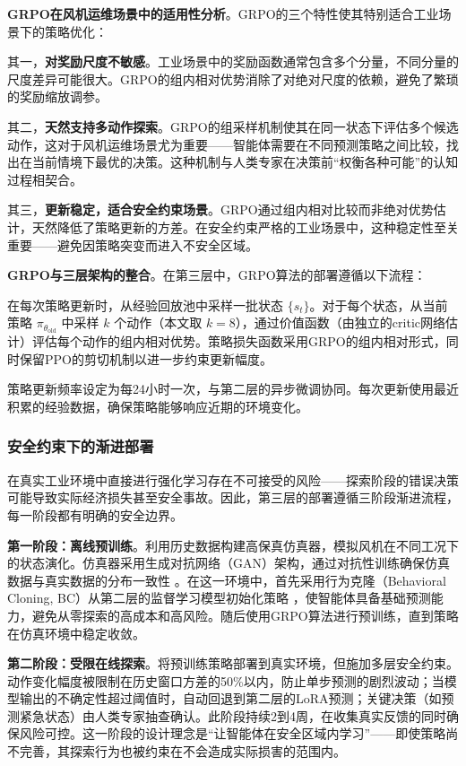 \documentclass[12pt,a4paper]{article}
\begin{document}
\textbf{GRPO在风机运维场景中的适用性分析}。GRPO的三个特性使其特别适合工业场景下的策略优化：

其一，\textbf{对奖励尺度不敏感}。工业场景中的奖励函数通常包含多个分量，不同分量的尺度差异可能很大。GRPO的组内相对优势消除了对绝对尺度的依赖，避免了繁琐的奖励缩放调参。

其二，\textbf{天然支持多动作探索}。GRPO的组采样机制使其在同一状态下评估多个候选动作，这对于风机运维场景尤为重要——智能体需要在不同预测策略之间比较，找出在当前情境下最优的决策。这种机制与人类专家在决策前“权衡各种可能”的认知过程相契合。

其三，\textbf{更新稳定，适合安全约束场景}。GRPO通过组内相对比较而非绝对优势估计，天然降低了策略更新的方差。在安全约束严格的工业场景中，这种稳定性至关重要——避免因策略突变而进入不安全区域。

\textbf{GRPO与三层架构的整合}。在第三层中，GRPO算法的部署遵循以下流程：

在每次策略更新时，从经验回放池中采样一批状态 $\{s_t\}$。对于每个状态，从当前策略 $\pi_{\theta_{\text{old}}}$ 中采样 $k$ 个动作（本文取 $k=8$），通过价值函数（由独立的critic网络估计）评估每个动作的组内相对优势。策略损失函数采用GRPO的组内相对形式，同时保留PPO的剪切机制以进一步约束更新幅度。

策略更新频率设定为每24小时一次，与第二层的异步微调协同。每次更新使用最近积累的经验数据，确保策略能够响应近期的环境变化。

\subsubsection{安全约束下的渐进部署}

在真实工业环境中直接进行强化学习存在不可接受的风险——探索阶段的错误决策可能导致实际经济损失甚至安全事故。因此，第三层的部署遵循三阶段渐进流程，每一阶段都有明确的安全边界。

\textbf{第一阶段：离线预训练}。利用历史数据构建高保真仿真器，模拟风机在不同工况下的状态演化。仿真器采用生成对抗网络（GAN）架构，通过对抗性训练确保仿真数据与真实数据的分布一致性 \cite{ganin2016domain}。在这一环境中，首先采用行为克隆（Behavioral Cloning, BC）从第二层的监督学习模型初始化策略 \cite{pomerleau1989alvinn}，使智能体具备基础预测能力，避免从零探索的高成本和高风险。随后使用GRPO算法进行预训练，直到策略在仿真环境中稳定收敛。

\textbf{第二阶段：受限在线探索}。将预训练策略部署到真实环境，但施加多层安全约束。动作变化幅度被限制在历史窗口方差的50\%以内，防止单步预测的剧烈波动；当模型输出的不确定性超过阈值时，自动回退到第二层的LoRA预测；关键决策（如预测紧急状态）由人类专家抽查确认。此阶段持续2到4周，在收集真实反馈的同时确保风险可控。这一阶段的设计理念是“让智能体在安全区域内学习”——即使策略尚不完善，其探索行为也被约束在不会造成实际损害的范围内。
\end{document}
